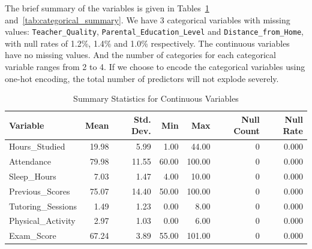 \documentclass[11pt]{article}
\begin{document}
The brief summary of the variables is given in Tables~\ref{tab:continuous_summary} and~\ref{tab:categorical_summary}. We have 3 categorical variables with missing values: \texttt{Teacher\_Quality}, \texttt{Parental\_Education\_Level} and \texttt{Distance\_from\_Home}, with null rates of 1.2\%, 1.4\% and 1.0\% respectively. The continuous variables have no missing values. And the number of categories for each categorical variable ranges from 2 to 4. If we choose to encode the categorical variables using one-hot encoding, the total number of predictors will not explode severely.

\begin{table}[htbp]
\centering
\caption{Summary Statistics for Continuous Variables}
\label{tab:continuous_summary}
\begin{tabular}{lrrrrrr}
\toprule
Variable & Mean & Std. Dev. & Min & Max & Null Count & Null Rate \\
\midrule
Hours\_Studied     & 19.98 & 5.99 & 1.00  & 44.00  & 0 & 0.000 \\
Attendance         & 79.98 & 11.55 & 60.00 & 100.00 & 0 & 0.000 \\
Sleep\_Hours       & 7.03  & 1.47 & 4.00  & 10.00  & 0 & 0.000 \\
Previous\_Scores   & 75.07 & 14.40 & 50.00 & 100.00 & 0 & 0.000 \\
Tutoring\_Sessions & 1.49  & 1.23 & 0.00  & 8.00   & 0 & 0.000 \\
Physical\_Activity & 2.97  & 1.03 & 0.00  & 6.00   & 0 & 0.000 \\
Exam\_Score        & 67.24 & 3.89 & 55.00 & 101.00 & 0 & 0.000 \\
\bottomrule
\end{tabular}
\end{table}
\end{document}
